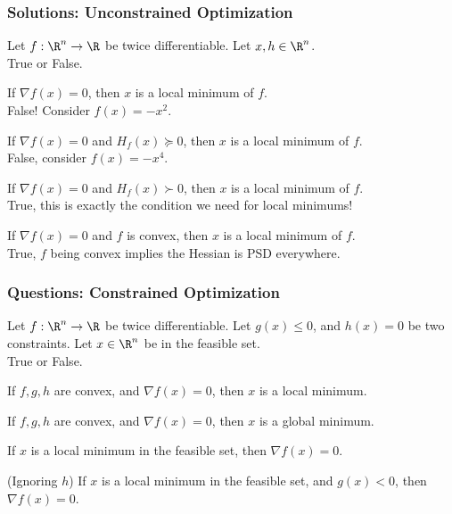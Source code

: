 \documentclass{beamer}
\renewenvironment{enumerate}%
{\begin{list}{\arabic{enumi}.}%
      {\setlength{\leftmargin}{2.5em}%
       \setlength{\itemsep}{-\parsep}%
       \setlength{\topsep}{-\parskip}%
       \usecounter{enumi}}%
 }{\end{list}}
\begin{document}
\begin{frame}
\frametitle{Solutions: Unconstrained Optimization}
Let $f: \R^n \rightarrow \R$ be twice differentiable. Let $x,h\in \R^n$.\\
 True or False.
\begin{solution}
\begin{enumerate}
\item[5.] If $\nabla f(x) = 0$, then $x$ is a local minimum of $f$.\\
False! Consider $f(x) = -x^2$.
\item[6.] If $\nabla f(x) = 0$ and $H_f(x) \succeq 0$, then $x$ is a local minimum of $f$.\\
False, consider $f(x) = -x^4$.
\item[7.] If $\nabla f(x) = 0$ and $H_f(x) \succ 0$, then $x$ is a local minimum of $f$.\\
True, this is exactly the condition we need for local minimums!
\item[8.] If $\nabla f(x) = 0$ and $f$ is convex, then $x$ is a local minimum of $f$.\\
True, $f$ being convex implies the Hessian is PSD everywhere.
\end{enumerate}
\end{solution}
\end{frame}

\begin{frame}
\frametitle{Questions: Constrained Optimization}
Let $f: \R^n \rightarrow \R$ be twice differentiable. Let $g(x) \leq 0$, and $h(x)=0$ be two constraints. Let $x\in \R^n$ be in the feasible set.\\
True or False.
\begin{enumerate}
\item If $f,g,h$ are convex, and $\nabla f(x) = 0$, then $x$ is a local minimum.
\item If $f,g,h$ are convex, and $\nabla f(x) = 0$, then $x$ is a global minimum. 
\item If $x$ is a local minimum in the feasible set, then $\nabla f(x) = 0$.
\item (Ignoring $h$) If $x$ is a local minimum in the feasible set, and $g(x) < 0$, then $\nabla f(x) = 0$. 
\end{enumerate}
\end{frame}
\end{document}
